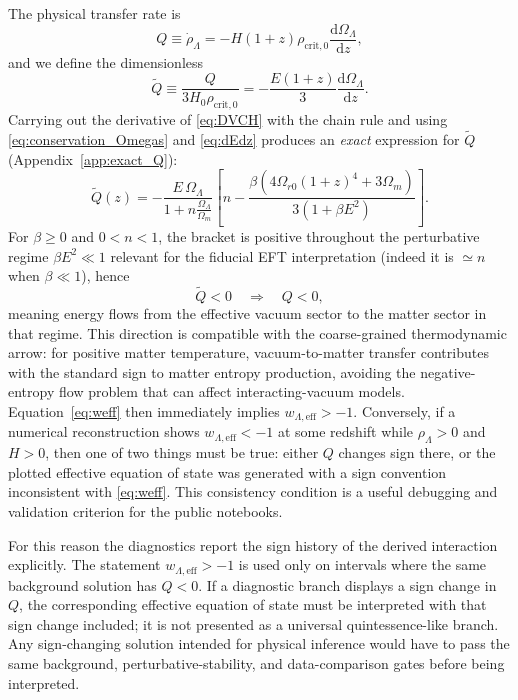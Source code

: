 \documentclass[pdflatex,sn-mathphys-num]{sn-jnl}%
\newcommand{\Omr}{\Omega_{r0}}
\newcommand{\Ecrit}{\rho_{\mathrm{crit},0}}
\newcommand{\Qtilde}{\widetilde{Q}}
\newcommand{\dd}{\mathrm{d}}
\begin{document}
The physical transfer rate is
\begin{equation}
Q \equiv \dot\rho_\Lambda = -H(1+z)\Ecrit \frac{\dd\Omega_\Lambda}{\dd z},
\end{equation}
and we define the dimensionless
\begin{equation}
\Qtilde \equiv \frac{Q}{3H_0\Ecrit}
= -\frac{E(1+z)}{3}\frac{\dd\Omega_\Lambda}{\dd z}.
\label{eq:Qtilde_def}
\end{equation}
Carrying out the derivative of \eqref{eq:DVCH} with the chain rule and using
\eqref{eq:conservation_Omegas} and \eqref{eq:dEdz} produces an \emph{exact}
expression for $\Qtilde$ (Appendix~\ref{app:exact_Q}):
\begin{equation}
\boxed{\Qtilde(z)=
-\frac{E\,\Omega_\Lambda}{1+n\frac{\Omega_\Lambda}{\Omega_m}}
\left[
n
-\frac{\beta\left(4\Omr(1+z)^4 + 3\Omega_m\right)}{3\left(1+\beta E^2\right)}
\right]
}.
\label{eq:Q_exact_box}
\end{equation}
For $\beta\ge 0$ and $0<n<1$, the bracket is positive throughout the
perturbative regime $\beta E^2\ll 1$ relevant for the fiducial EFT
interpretation (indeed it is $\simeq n$ when $\beta\ll 1$), hence
\begin{equation}
\Qtilde<0\quad \Rightarrow \quad Q<0,
\end{equation}
meaning energy flows from the effective vacuum sector to the matter sector in
that regime. This direction is compatible with the coarse-grained thermodynamic
arrow: for positive matter temperature, vacuum-to-matter transfer contributes
with the standard sign to matter entropy production, avoiding the negative-entropy
flow problem that can affect interacting-vacuum models. Equation~\eqref{eq:weff}
then immediately implies $w_{\Lambda,\mathrm{eff}}>-1$. Conversely, if a numerical reconstruction shows
$w_{\Lambda,\mathrm{eff}}<-1$ at some redshift while $\rho_\Lambda>0$ and
$H>0$, then one of two things must be true: either $Q$ changes sign there, or
the plotted effective equation of state was generated with a sign convention
inconsistent with \eqref{eq:weff}. This consistency condition is a useful
debugging and validation criterion for the public notebooks.

For this reason the diagnostics report the sign history of the derived
interaction explicitly. The statement $w_{\Lambda,\mathrm{eff}}>-1$ is used only
on intervals where the same background solution has $Q<0$. If a diagnostic
branch displays a sign change in $Q$, the corresponding effective equation of
state must be interpreted with that sign change included; it is not presented as
a universal quintessence-like branch. Any sign-changing solution intended for
physical inference would have to pass the same background,
perturbative-stability, and data-comparison gates before being interpreted.
\end{document}
